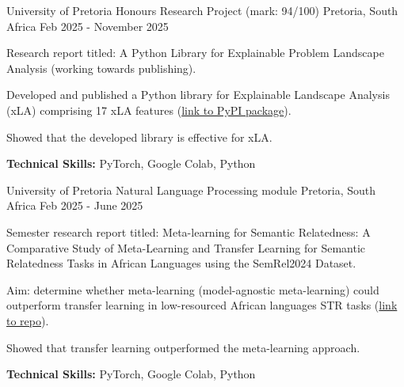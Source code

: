 

\begin{cventries}    
  \cventry
    {University of Pretoria} %
    {Honours Research Project (mark: 94/100)} %
    {Pretoria, South Africa} %
    {Feb 2025 - November 2025} %
    {
      \begin{cvitems} %
        \item {Research report titled: A Python Library for Explainable Problem Landscape Analysis (working towards publishing).}
        \item {Developed and published a Python library for Explainable Landscape Analysis (xLA) comprising 17 xLA features (\href{https://pypi.org/project/pyxla/}{link to PyPI package}).}
        \item {Showed that the developed library is effective for xLA.}
        \item {\textbf{Technical Skills:} PyTorch, Google Colab, Python}
      \end{cvitems}
    }

  \cventry
    {University of Pretoria} %
    {Natural Language Processing module} %
    {Pretoria, South Africa} %
    {Feb 2025 - June 2025} %
    {
      \begin{cvitems} %
        \item {Semester research report titled: Meta-learning for Semantic Relatedness: A Comparative Study of Meta-Learning and Transfer Learning for Semantic Relatedness Tasks in African Languages using the SemRel2024 Dataset.}
        \item{Aim: determine whether meta-learning (model-agnostic meta-learning) could outperform transfer learning in low-resourced African languages STR tasks (\href{https://github.com/tmogoa/meta-learning-for-str}{link to repo}).}
        \item {Showed that transfer learning outperformed the meta-learning approach.}
        \item {\textbf{Technical Skills:} PyTorch, Google Colab, Python}
      \end{cvitems}
    }


\end{cventries}
